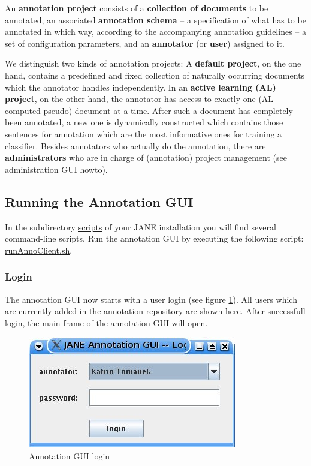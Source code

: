 \documentclass[DIV12,english,11pt,halfparskip]{scrartcl}
\begin{document}
An \textbf{annotation project} consists of a \textbf{collection of
  documents} to be annotated, an associated \textbf{annotation schema}
-- a specification of what has to be annotated in which way, according
to the accompanying annotation guidelines -- a set of configuration
parameters, and an \textbf{annotator} (or \textbf{user}) assigned to
it.

We distinguish two kinds of annotation projects: A \textbf{default
  project}, on the one hand, contains a predefined and fixed
collection of naturally occurring documents which the annotator
handles independently. In an \textbf{active learning
  (AL) project}, on the other hand, the annotator has access to
exactly one (AL-computed pseudo) document at a time. After such a
document has completely been annotated, a new one is dynamically
constructed which contains those sentences for annotation which are
the most informative ones for training a classifier.  Besides
annotators who actually do the annotation, there are
\textbf{administrators} who are in charge of (annotation) project
management (see administration GUI howto).




\subsection{Running the Annotation GUI}
In the subdirectory \url{scripts} of your \textsc{JANE} installation you
will find several command-line scripts. Run the annotation GUI by
executing the following script: \url{runAnnoClient.sh}.

\subsubsection{Login}
The annotation GUI now starts with a user login (see figure
\ref{fig:loginfigure}). All users which are currently added in the
annotation repository are shown here. After successfull login, the
main frame of the annotation GUI will open.

\begin{figure}[h]
  \centering
  \includegraphics[scale=0.7]{figs/AnnoClientLogin.jpg}
  \caption{Annotation GUI login}
  \label{fig:loginfigure}
\end{figure}
\end{document}
